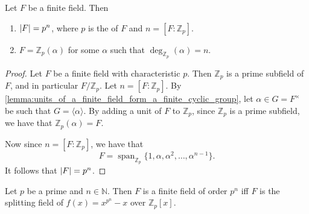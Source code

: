 \documentclass[notoc,notitlepage,nobib]{tufte-book}
\DeclareMathOperator{\Span}{span}
\begin{document}
\begin{propo}\label{propo:order_of_finite_fields_are_powers_of_its_primal_characteristic}
  Let $F$ be a finite field. Then
  \begin{enumerate}
    \item $\left|F\right| = p^n$, where $p$ is the  of
      $F$ and $n = [F : \mathbb{Z}_p]$.
    \item $F = \mathbb{Z}_p(\alpha)$ for some $\alpha$ such that
      $\deg_{\mathbb{Z}_p}(\alpha) = n$.
  \end{enumerate}
\end{propo}

\begin{proof}
  Let $F$ be a finite field with characteristic $p$. Then $\mathbb{Z}_p$ is a prime
  subfield of $F$, and in particular $F / \mathbb{Z}_p$. Let $n = [ F : \mathbb{Z}_p ]$.
  By \cref{lemma:units_of_a_finite_field_form_a_finite_cyclic_group}, let $\alpha \in G =
  F^\times$ be such that $G = \langle \alpha \rangle$. By adding a unit of $F$ to
  $\mathbb{Z}_p$, since $\mathbb{Z}_p$ is a prime subfield, we have that
  $\mathbb{Z}_p(\alpha) = F$.

  Now since $n = [F : \mathbb{Z}_p]$, we have that
  \begin{equation*}
    F = \Span_{\mathbb{Z}_p} \{ 1, \alpha, \alpha^2, \ldots, \alpha^{n - 1} \}.
  \end{equation*}
  It follows that $\left|F\right| = p^n$.
\end{proof}

\begin{thm}\label{thm:finite_fields_as_splitting_fields}
  Let $p$ be a prime and $n \in \mathbb{N}$. Then $F$ is a finite field of order $p^n$ iff
  $F$ is the splitting field of $f(x) = x^{p^n} - x$ over $\mathbb{Z}_p[x]$.
\end{thm}
\end{document}
